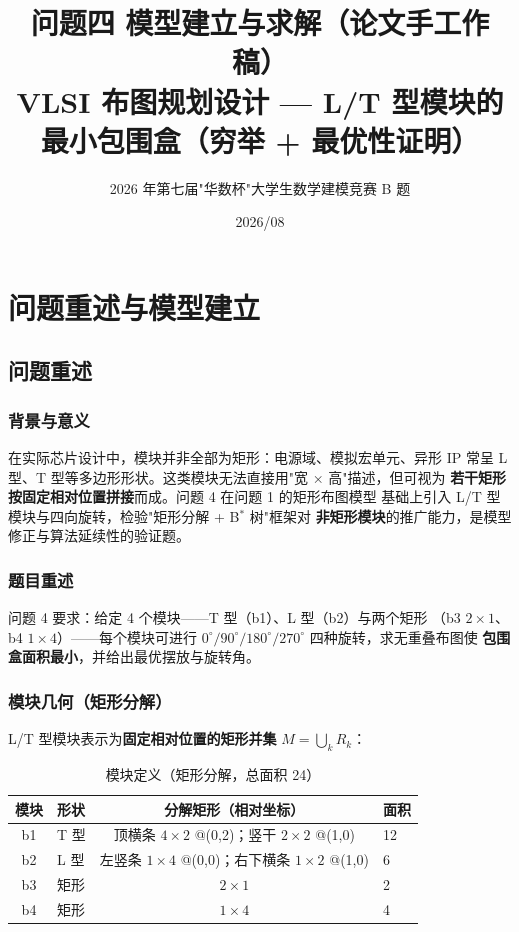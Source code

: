 \documentclass[12pt,a4paper]{article}
\title{\textbf{问题四 模型建立与求解（论文手工作稿）}\\[6pt]
\large VLSI 布图规划设计 --- L/T 型模块的最小包围盒（穷举 + 最优性证明）}
\author{2026 年第七届"华数杯"大学生数学建模竞赛 B 题}
\date{2026/08}
\begin{document}
\maketitle
\tableofcontents
\newpage

\section{问题重述与模型建立}

\subsection{问题重述}

\subsubsection*{背景与意义}

在实际芯片设计中，模块并非全部为矩形：电源域、模拟宏单元、异形 IP 常呈
L 型、T 型等多边形形状。这类模块无法直接用"宽 × 高"描述，但可视为
\textbf{若干矩形按固定相对位置拼接}而成。问题 4 在问题 1 的矩形布图模型
基础上引入 L/T 型模块与四向旋转，检验"矩形分解 + B$^*$ 树"框架对
\textbf{非矩形模块}的推广能力，是模型修正与算法延续性的验证题。

\subsubsection*{题目重述}

问题 4 要求：给定 4 个模块——T 型（b1）、L 型（b2）与两个矩形
（b3 $2\times1$、b4 $1\times4$）——每个模块可进行
$0^\circ / 90^\circ / 180^\circ / 270^\circ$ 四种旋转，求无重叠布图使
\textbf{包围盒面积最小}，并给出最优摆放与旋转角。

\subsubsection*{模块几何（矩形分解）}

L/T 型模块表示为\textbf{固定相对位置的矩形并集} $M = \bigcup_{k} R_k$：
\begin{table}[H]
\centering
\caption{模块定义（矩形分解，总面积 24）}\label{tab:mod}
\small
\begin{tabular}{clcl}
\toprule
模块 & 形状 & 分解矩形（相对坐标） & 面积 \\
\midrule
b1 & T 型 & 顶横条 $4\times2$ @(0,2)；竖干 $2\times2$ @(1,0) & 12 \\
b2 & L 型 & 左竖条 $1\times4$ @(0,0)；右下横条 $1\times2$ @(1,0) & 6 \\
b3 & 矩形 & $2\times1$ & 2 \\
b4 & 矩形 & $1\times4$ & 4 \\
\bottomrule
\end{tabular}
\end{table}
\end{document}
